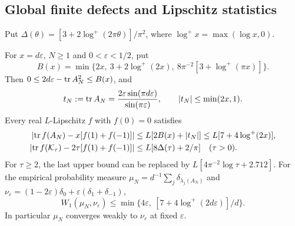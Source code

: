 \subsection{Global finite defects and Lipschitz statistics}
\label{sec:rev:lip}
Put $\Delta(\theta)=[3+2\log^+(2\pi\theta)]/\pi^2$, where
$\log^+x=\max(\log x,0)$.
\begin{theorem}
\label{lem:rev:lip}\label{lem:rev:lip:defect}
\label{thm:rev:lip:trace}\label{T3:lem:deficit}
\label{cor:rev:lip:wasserstein}
For $x=d\varepsilon$, $N\ge1$ and $0<\varepsilon<1/2$, put
\begin{equation}\label{compact:eq:finite-defect-min}
 B(x)=\min\{2x,\ 3+2\log^+(2x),\
                 8\pi^{-2}[3+\log^+(\pi x)]\}.
\end{equation}
Then $0\le2d\varepsilon-\operatorname{tr} A_N^2\le B(x)$, and
\begin{equation}\label{eq:T3:trace}
t_N:=\operatorname{tr} A_N=\frac{2\varepsilon\sin(\pi d\varepsilon)}
{\sin(\pi\varepsilon)},\qquad |t_N|\le\min(2x,1).
\end{equation}
Every real $L$-Lipschitz $f$ with $f(0)=0$ satisfies
\begin{align}
\left|\operatorname{tr} f(A_N)-x[f(1)+f(-1)]\right|
&\le L[2B(x)+|t_N|]\le L[7+4\log^+(2x)],
\label{compact:eq:finite-lip-min}\\
\left|\operatorname{tr} f(\mathcal K_\tau)-2\tau[f(1)+f(-1)]\right|
&\le L[8\Delta(\tau)+2/\pi]\quad(\tau>0).
\label{eq:rev:lip:continuum}
\end{align}
For $\tau\ge2$, the last upper bound can be replaced by
$L[4\pi^{-2}\log\tau+2.712]$.
For the empirical probability measure
$\mu_N=d^{-1}\sum_j\delta_{\lambda_j(A_N)}$ and
$\nu_\varepsilon=(1-2\varepsilon)\delta_0+
\varepsilon(\delta_1+\delta_{-1})$,
\begin{equation}\label{eq:rev:lip:wasserstein}
W_1(\mu_N,\nu_\varepsilon)
\le\min\{4\varepsilon,\ [7+4\log^+(2d\varepsilon)]/d\}.
\end{equation}
In particular $\mu_N$ converges weakly to $\nu_\varepsilon$
at fixed $\varepsilon$.
\end{theorem}
